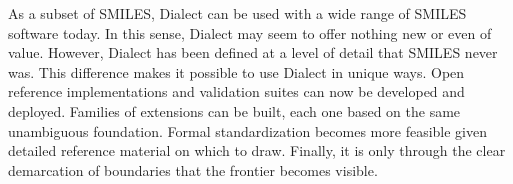 \documentclass{article}
\begin{document}
As a subset of SMILES, Dialect can be used with a wide range of SMILES software today. In this sense, Dialect may seem to offer nothing new or even of value. However, Dialect has been defined at a level of detail that SMILES never was. This difference makes it possible to use Dialect in unique ways. Open reference implementations and validation suites can now be developed and deployed. Families of extensions can be built, each one based on the same unambiguous foundation. Formal standardization becomes more feasible given detailed reference material on which to draw. Finally, it is only through the clear demarcation of boundaries that the frontier becomes visible.

\clearpage
\printbibliography
\end{document}
